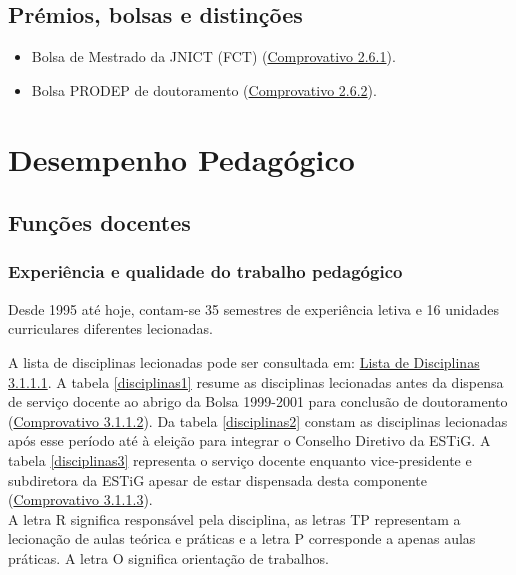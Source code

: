 \documentclass[11pt]{article}
\begin{document}
\subsection{Prémios, bolsas e distinções}
\begin{itemize}
\item {Bolsa de Mestrado da JNICT (FCT) (\href{run:Bolsas/fctMest.pdf}{Comprovativo 2.6.1}).}
\item {Bolsa PRODEP de doutoramento (\href{run:Bolsas/prodepPHD.pdf}{Comprovativo 2.6.2}).}
\end{itemize}

\section{Desempenho Pedagógico}

\subsection{Funções docentes}

\subsubsection{Experiência e qualidade do trabalho pedagógico}

Desde 1995 até hoje, contam-se 35 semestres de experiência letiva e 16 unidades curriculares diferentes lecionadas.

A lista de disciplinas lecionadas pode ser consultada em: \href{run:Disciplinas/Disciplinas.pdf}{Lista de Disciplinas 3.1.1.1}.
A tabela \ref{disciplinas1} resume as disciplinas lecionadas antes da dispensa de serviço docente ao abrigo da Bolsa 1999-2001 para conclusão de doutoramento (\href{run:Bolsas/DispensaProdep.pdf}{Comprovativo 3.1.1.2}).
Da tabela \ref{disciplinas2} constam as disciplinas lecionadas após esse período até à eleição para integrar o Conselho Diretivo da ESTiG.
A tabela \ref{disciplinas3} representa o serviço docente enquanto vice-presidente e subdiretora da ESTiG apesar de estar dispensada desta componente (\href{run:Bolsas/DispensaSubdiretora.pdf}{Comprovativo 3.1.1.3}).\\
A letra R significa responsável pela disciplina, as letras TP representam a lecionação de aulas teórica e práticas e a letra P corresponde a apenas aulas práticas.
A letra O significa orientação de trabalhos. 
\end{document}
